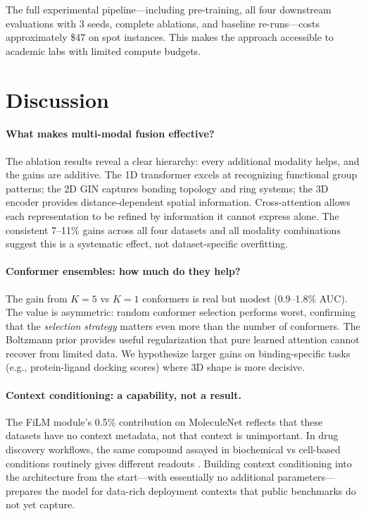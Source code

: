 \documentclass[11pt]{article}
\begin{document}
The full experimental pipeline---including pre-training, all four downstream evaluations with 3 seeds, complete ablations, and baseline re-runs---costs approximately \$47 on spot instances. This makes the approach accessible to academic labs with limited compute budgets.

\section{Discussion}
\label{sec:discussion}

\paragraph{What makes multi-modal fusion effective?}
The ablation results reveal a clear hierarchy: every additional modality helps, and the gains are additive. The 1D transformer excels at recognizing functional group patterns; the 2D GIN captures bonding topology and ring systems; the 3D encoder provides distance-dependent spatial information. Cross-attention allows each representation to be refined by information it cannot express alone. The consistent 7--11\% gains across all four datasets and all modality combinations suggest this is a systematic effect, not dataset-specific overfitting.

\paragraph{Conformer ensembles: how much do they help?}
The gain from $K=5$ vs $K=1$ conformers is real but modest (0.9--1.8\% AUC). The value is asymmetric: random conformer selection performs worst, confirming that the \emph{selection strategy} matters even more than the number of conformers. The Boltzmann prior provides useful regularization that pure learned attention cannot recover from limited data. We hypothesize larger gains on binding-specific tasks (e.g., protein-ligand docking scores) where 3D shape is more decisive.

\paragraph{Context conditioning: a capability, not a result.}
The FiLM module's 0.5\% contribution on MoleculeNet reflects that these datasets have no context metadata, not that context is unimportant. In drug discovery workflows, the same compound assayed in biochemical vs cell-based conditions routinely gives different readouts \citep{kola2004can}. Building context conditioning into the architecture from the start---with essentially no additional parameters---prepares the model for data-rich deployment contexts that public benchmarks do not yet capture.
\end{document}

